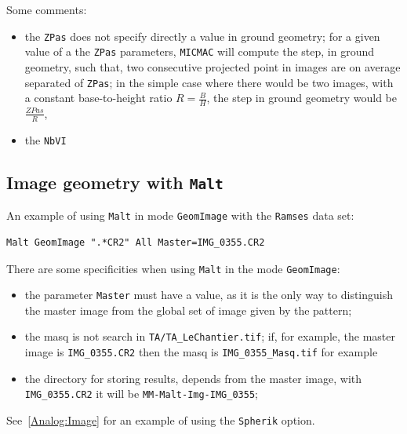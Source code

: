 Some comments:

\begin{itemize}
   \item  the {\tt ZPas} does not specify directly a value in ground geometry;
         for a given value of a the {\tt ZPas} parameters,  {\tt MICMAC} will compute
         the step, in ground geometry, such that, two consecutive projected point in images are
         on average separated of {\tt ZPas};
         in the simple case where there would be two images, with a constant base-to-height ratio $R=\frac{B}{H}$,
         the step in ground geometry would be $\frac{ZPas}{R}$,


   \item the {\tt NbVI}
\end{itemize}

\subsection{Image geometry with {\tt Malt}}

An example of using {\tt Malt} in mode {\tt GeomImage}
with the {\tt Ramses} data set:

\begin{verbatim}
Malt GeomImage ".*CR2" All Master=IMG_0355.CR2
\end{verbatim}

There are some specificities when using {\tt Malt} in the mode {\tt GeomImage}:

\begin{itemize}
   \item  the parameter {\tt Master} must have a value, as it is the only way to
          distinguish the master image from the global set of image given by the pattern;
   \item the masq is not search in {\tt TA/TA\_LeChantier.tif}; if, for example,
         the master  image is {\tt IMG\_0355.CR2} then the masq is {\tt IMG\_0355\_Masq.tif}
         for example
   \item the directory for storing results, depends from the master image, with {\tt IMG\_0355.CR2}
         it will be  {\tt MM-Malt-Img-IMG\_0355};

\end{itemize}


See~\ref{Analog:Image} for an example of using the {\tt Spherik} option.





